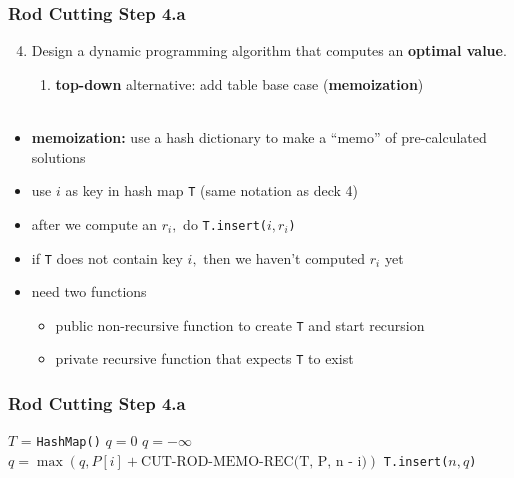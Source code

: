\documentclass[10pt,aspectratio=169]{beamer}
\newcommand{\stanza}{ \\~\ }
\begin{document}
\begin{frame} \frametitle{Rod Cutting Step 4.a}
  \begin{enumerate}
    \setcounter{enumi}{3}
    \item Design a dynamic programming algorithm that computes an \textbf{optimal value}.
    \begin{enumerate}
      \item \textbf{top-down} alternative: add table base case (\textbf{memoization})
      \stanza
    \end{enumerate}
\end{enumerate}

\begin{itemize}
  \item \textbf{memoization:} use a hash dictionary to make a ``memo'' of pre-calculated solutions
  \item use $i$ as key in hash map \texttt{T} (same notation as deck 4)
  \item after we compute an $r_i,$ do \texttt{T.insert(}$i, r_i$\texttt{)}
  \item if \texttt{T} does not contain key $i,$ then we haven't computed $r_i$ yet
  \item need two functions
  \begin{itemize}
    \item public non-recursive function to create \texttt{T} and start recursion
    \item private recursive function that expects \texttt{T} to exist
  \end{itemize}
\end{itemize}
\end{frame}

\begin{frame} \frametitle{Rod Cutting Step 4.a}
  {\scriptsize
  \begin{algorithmic}[1]
    \State $T$ = \texttt{HashMap()}
    \State {}
    \EndFunction
      \State {}
    \EndIf
      \State $q=0$
    \Else
      \State $q=-\infty$
        \State $q = \max(q, P[i] + \text{CUT-ROD-MEMO-REC(T, P, n - i)})$
      \EndFor
    \EndIf
    \State \texttt{T.insert(}$n, q$\texttt{)}
    \State {}
    \EndFunction
  \end{algorithmic}
  }
\end{frame}
\end{document}
